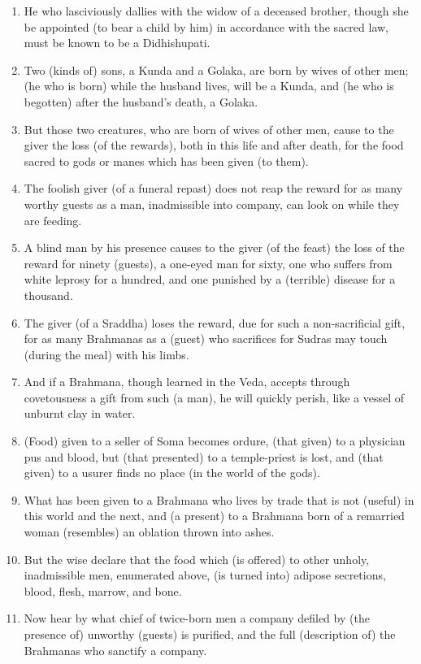\begin{enumerate}
\item He who lasciviously dallies with the widow of a deceased brother, though she be appointed (to bear a child by him) in accordance with the sacred law, must be known to be a Didhishupati.
\item Two (kinds of) sons, a Kunda and a Golaka, are born by wives of other men; (he who is born) while the husband lives, will be a Kunda, and (he who is begotten) after the husband's death, a Golaka.
\item But those two creatures, who are born of wives of other men, cause to the giver the loss (of the rewards), both in this life and after death, for the food sacred to gods or manes which has been given (to them).
\item The foolish giver (of a funeral repast) does not reap the reward for as many worthy guests as a man, inadmissible into company, can look on while they are feeding.
\item A blind man by his presence causes to the giver (of the feast) the loss of the reward for ninety (guests), a one-eyed man for sixty, one who suffers from white leprosy for a hundred, and one punished by a (terrible) disease for a thousand.
\item The giver (of a Sraddha) loses the reward, due for such a non-sacrificial gift, for as many Brahmanas as a (guest) who sacrifices for Sudras may touch (during the meal) with his limbs.
\item And if a Brahmana, though learned in the Veda, accepts through covetousness a gift from such (a man), he will quickly perish, like a vessel of unburnt clay in water.
\item (Food) given to a seller of Soma becomes ordure, (that given) to a physician pus and blood, but (that presented) to a temple-priest is lost, and (that given) to a usurer finds no place (in the world of the gods).
\item What has been given to a Brahmana who lives by trade that is not (useful) in this world and the next, and (a present) to a Brahmana born of a remarried woman (resembles) an oblation thrown into ashes.
\item But the wise declare that the food which (is offered) to other unholy, inadmissible men, enumerated above, (is turned into) adipose secretions, blood, flesh, marrow, and bone.
\item Now hear by what chief of twice-born men a company defiled by (the presence of) unworthy (guests) is purified, and the full (description of) the Brahmanas who sanctify a company.

\end{enumerate}
